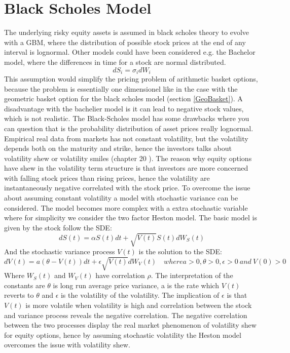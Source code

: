 \section{Black Scholes Model}
The underlying risky equity assets is assumed in black scholes theory to evolve with a GBM, where the distribution of possible stock prices at the end of any interval is lognormal. Other models could have been considered e.g. the Bachelor model, where the differences in time for a stock are normal distributed. 
\begin{equation*}
dS_i=\sigma_i dW_i
\end{equation*}
This assumption would simplify the pricing problem of arithmetic basket options, because the problem is essentially one dimensionel like in the case with the geometric basket option for the black scholes model (section \ref{GeoBasket}). A disadvantage with the bachelier model is it can lead to negative stock values, which is not realistic. The Black-Scholes model has some drawbacks where you can question that is the probability distribution of asset prices really lognormal. \\

Empirical real data from markets has not constant volatility, but the volatility depends both on the maturity and strike, hence the investors talks about volatility shew or volatility smiles (chapter 20 \parencite{Hull}). The reason why equity options have shew in the volatility term structure is that investors are more concerned with falling stock prices than rising prices, hence the volatility are instantaneously negative correlated with the stock price. To overcome the issue about assuming constant volatility a model with stochastic variance can be considered. The model becomes more complex with a extra stochastic variable where for simplicity we consider the two factor Heston model. The basic model is given by the stock follow the SDE:
$$dS(t)=\alpha S(t) dt + \sqrt{V(t)} S(t) dW_S(t)$$
And the stochastic variance process $V(t)$ is the solution to the SDE:
$$dV(t)=a(\theta - V(t))dt + \epsilon \sqrt{V(t)} dW_V(t) \quad where a>0,\theta>0, \epsilon>0 \ and \ V(0)>0$$
Where $W_S(t)$ and $W_V(t)$ have correlation $\rho$. The interpretation of the constants are $\theta$ is long run average price variance, a is the rate which $V(t)$ reverts to $\theta$ and $\epsilon$ is the volatility of the volatility. The implication of $\epsilon$ is that $V(t)$ is more volatile when volatility is high and correlation between the stock and variance process reveals the negative correlation. The negative correlation between the two processes display the real market phenomenon of volatility shew for equity options, hence by assuming stochastic volatility the Heston model overcomes the issue with volatility shew.\\

